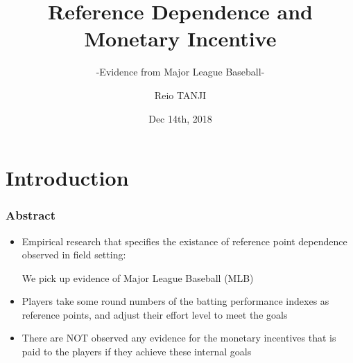 \documentclass[dvipdfmx,12pt]{beamer}
\title{Reference Dependence and Monetary Incentive}
\subtitle{-Evidence from Major League Baseball-}
\author{Reio TANJI}
\date{Dec 14th, 2018}
\institute{Osaka University}
\begin{document}
\begin{frame}\frametitle{}
\titlepage
\end{frame}

\section{Introduction}
\begin{frame}\frametitle{Abstract}
  \begin{itemize}
    \item Empirical research that specifies the existance of reference point dependence observed in field setting:

    We pick up evidence of Major League Baseball (MLB)

    \item Players take some round numbers of the batting performance indexes as reference points, and adjust their effort level to meet the goals

    \item There are NOT observed any evidence for the monetary incentives that is paid to the players if they achieve these internal goals
  \end{itemize}
\end{frame}

\begin{frame}\frametitle{}

\end{frame}

\begin{frame}\frametitle{}

\end{frame}

\begin{frame}\frametitle{}

\end{frame}

\begin{frame}\frametitle{}

\end{frame}

\begin{frame}\frametitle{}

\end{frame}

\begin{frame}\frametitle{}

\end{frame}

\begin{frame}\frametitle{}

\end{frame}
\end{document}
